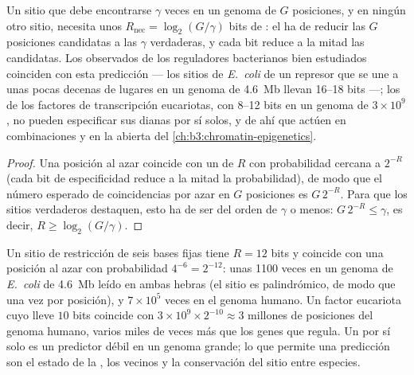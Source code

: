 \begin{proposition}\label{prop:b3:bioinformatics:bits}
Un sitio que debe encontrarse $\gamma$ veces en un genoma de $G$
posiciones, y en ningún otro sitio, necesita unos
$R_{\text{nec}} = \log_{2}(G/\gamma)$ bits de : el  ha de reducir las $G$ posiciones candidatas a las
$\gamma$ verdaderas, y cada bit reduce a la mitad las candidatas. Los
 observados de los reguladores bacterianos bien estudiados
coinciden con esta predicción --- los sitios de \emph{E.~coli} de un
represor que se une a unas pocas decenas de lugares en un genoma de
\qty{4.6}{Mb} llevan \numrange{16}{18} bits ---; los  de los
factores de transcripción eucariotas, con \numrange{8}{12} bits en un
genoma de $3\times 10^{9}$, no pueden especificar sus dianas por sí
solos, y de ahí que actúen en combinaciones y en la  abierta del
\cref{ch:b3:chromatin-epigenetics}.
\end{proposition}
\begin{proof}
Una posición al azar coincide con un  de 
$R$ con probabilidad cercana a $2^{-R}$ (cada bit de especificidad reduce
a la mitad la probabilidad), de modo que el número esperado de
coincidencias por azar en $G$ posiciones es $G\,2^{-R}$. Para que los
sitios verdaderos destaquen, esto ha de ser del orden de $\gamma$ o
menos: $G\,2^{-R} \le \gamma$, es decir, $R \ge \log_{2}(G/\gamma)$.
\end{proof}

\begin{example}\label{ex:b3:bioinformatics:motif-numbers}
Un sitio de restricción de seis bases fijas tiene $R = 12$ bits y
coincide con una posición al azar con probabilidad $4^{-6} = 2^{-12}$:
unas \num{1100} veces en un genoma de \emph{E.~coli} de \qty{4.6}{Mb}
leído en ambas hebras (el sitio es palindrómico, de modo que una vez por
posición), y $7\times 10^{5}$ veces en el genoma humano. Un factor
eucariota cuyo  lleve $10$ bits coincide con
$3\times 10^{9}\times 2^{-10} \approx 3$ millones de posiciones del
genoma humano, varios miles de veces más que los genes que regula. Un
 por sí solo es un predictor débil en un genoma grande; lo que
permite una predicción son el estado de la , los  vecinos
y la conservación del sitio entre especies.
\end{example}

